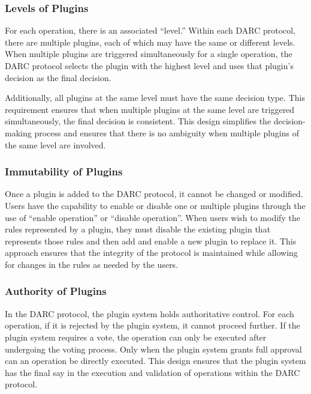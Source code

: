 \documentclass[main.tex]{subfiles}
\begin{document}
\subsubsection{Levels of Plugins}

For each operation, there is an associated ``level.'' Within each DARC protocol, there are multiple plugins, each of which may have the same or different levels. When multiple plugins are triggered simultaneously for a single operation, the DARC protocol selects the plugin with the highest level and uses that plugin's decision as the final decision.

Additionally, all plugins at the same level must have the same decision type. This requirement ensures that when multiple plugins at the same level are triggered simultaneously, the final decision is consistent. This design simplifies the decision-making process and ensures that there is no ambiguity when multiple plugins of the same level are involved.

\subsubsection{Immutability of Plugins}

Once a plugin is added to the DARC protocol, it cannot be changed or modified. Users have the capability to enable or disable one or multiple plugins through the use of ``enable operation'' or ``disable operation''.  When users wish to modify the rules represented by a plugin, they must disable the existing plugin that represents those rules and then add and enable a new plugin to replace it. This approach ensures that the integrity of the protocol is maintained while allowing for changes in the rules as needed by the users.

\subsubsection{Authority of Plugins}

In the DARC protocol, the plugin system holds authoritative control. For each operation, if it is rejected by the plugin system, it cannot proceed further. If the plugin system requires a vote, the operation can only be executed after undergoing the voting process. Only when the plugin system grants full approval can an operation be directly executed. This design ensures that the plugin system has the final say in the execution and validation of operations within the DARC protocol.
\end{document}
